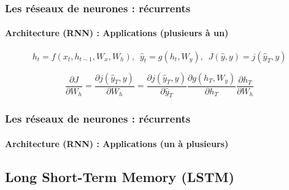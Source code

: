 \documentclass[xcolor=table]{beamer}
\begin{document}
\begin{frame}
	\frametitle{Les réseaux de neurones : récurrents}
	\framesubtitle{Architecture (RNN) : Applications (plusieurs à un)}
	
	\vspace*{-0.5cm}
	\[ h_t = f(x_t, h_{t-1}, W_x, W_h),\,\,\, \hat{y}_t = g(h_t, W_y),\,\,\,  J(\hat{y}, y) = j(\hat{y}_T, y)\]
	
	\begin{minipage}{0.7\textwidth}\scriptsize
		\[\frac{\partial J}{\partial W_h} = \frac{\partial j(\hat{y}_T, y)}{\partial W_h}
		= \frac{\partial j(\hat{y}_T, y)}{\partial \hat{y}_T} 
		\frac{\partial g(h_T, W_y)}{\partial h_T} 
		\frac{\partial h_T}{\partial W_h}
		\]
	\end{minipage}
	\begin{minipage}{0.2\textwidth}
	\end{minipage}

\end{frame}

\begin{frame}
	\frametitle{Les réseaux de neurones : récurrents}
	\framesubtitle{Architecture (RNN) : Applications (un à plusieurs)}
	
	
\end{frame}

\subsection{Long Short-Term Memory (LSTM)}
\end{document}
